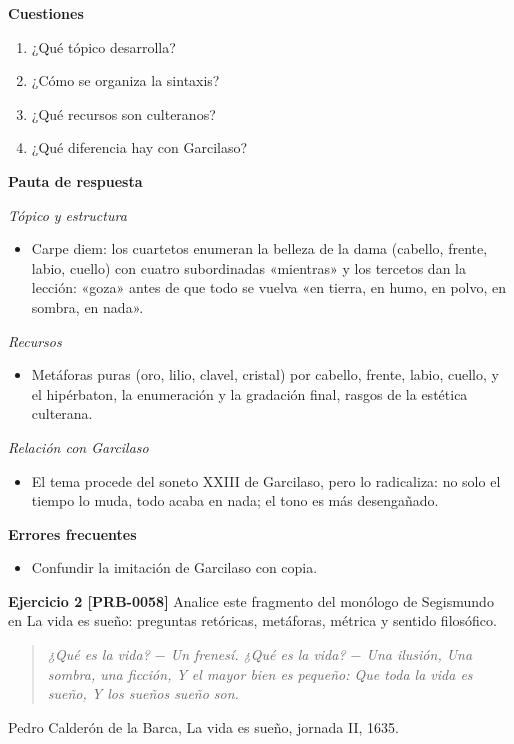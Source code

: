 \documentclass{book}
\begin{document}
\noindent\textbf{Cuestiones}
\begin{enumerate}
\item ¿Qué tópico desarrolla?
\item ¿Cómo se organiza la sintaxis?
\item ¿Qué recursos son culteranos?
\item ¿Qué diferencia hay con Garcilaso?
\end{enumerate}

\noindent\textbf{Pauta de respuesta}

\noindent\textit{Tópico y estructura}
\begin{itemize}
\item Carpe diem: los cuartetos enumeran la belleza de la dama (cabello, frente, labio, cuello) con cuatro subordinadas «mientras» y los tercetos dan la lección: «goza» antes de que todo se vuelva «en tierra, en humo, en polvo, en sombra, en nada».
\end{itemize}

\noindent\textit{Recursos}
\begin{itemize}
\item Metáforas puras (oro, lilio, clavel, cristal) por cabello, frente, labio, cuello, y el hipérbaton, la enumeración y la gradación final, rasgos de la estética culterana.
\end{itemize}

\noindent\textit{Relación con Garcilaso}
\begin{itemize}
\item El tema procede del soneto XXIII de Garcilaso, pero lo radicaliza: no solo el tiempo lo muda, todo acaba en nada; el tono es más desengañado.
\end{itemize}

\noindent\textbf{Errores frecuentes}
\begin{itemize}
\item Confundir la imitación de Garcilaso con copia.
\end{itemize}

\noindent\textbf{Ejercicio 2 [PRB-0058]}
Analice este fragmento del monólogo de Segismundo en La vida es sueño: preguntas retóricas, metáforas, métrica y sentido filosófico.


\begin{quote}
\itshape ¿Qué es la vida? \(-\) Un frenesí. ¿Qué es la vida? \(-\) Una ilusión, Una sombra, una ficción, Y el mayor bien es pequeño: Que toda la vida es sueño, Y los sueños sueño son.
\end{quote}
{\noindent\footnotesize Pedro Calderón de la Barca, La vida es sueño, jornada II, 1635.\par}
\end{document}

